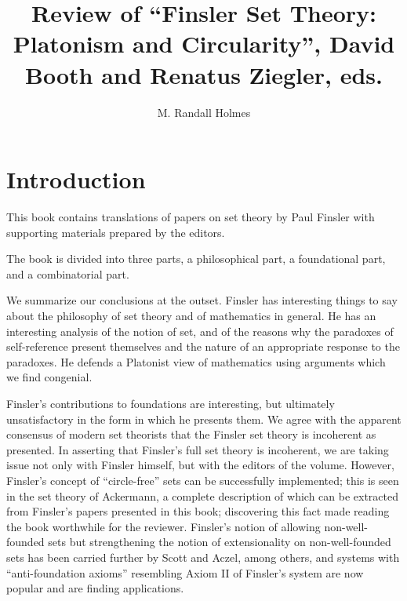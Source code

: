
\title{Review of ``Finsler Set Theory:  Platonism and Circularity'', David Booth and Renatus Ziegler, eds.}

\author{M. Randall Holmes}



\maketitle

\section{Introduction}

This book contains translations of papers on set theory by Paul
Finsler with supporting materials prepared by the editors.

The book is divided into three parts, a philosophical part, a
foundational part, and a combinatorial part.

We summarize our conclusions at the outset.  Finsler has interesting
things to say about the philosophy of set theory and of mathematics in
general.  He has an interesting analysis of the notion of set, and of
the reasons why the paradoxes of self-reference present themselves and
the nature of an appropriate response to the paradoxes.  He defends a
Platonist view of mathematics using arguments which we find
congenial.

Finsler's contributions to foundations are interesting, but ultimately
unsatisfactory in the form in which he presents them.  We agree with
the apparent consensus of modern set theorists that the Finsler set
theory is incoherent as presented.  In asserting that Finsler's full
set theory is incoherent, we are taking issue not only with Finsler
himself, but with the editors of the volume. However, Finsler's
concept of ``circle-free'' sets can be successfully implemented; this
is seen in the set theory of Ackermann, a complete description of
which can be extracted from Finsler's papers presented in this book;
discovering this fact made reading the book worthwhile for the
reviewer.  Finsler's notion of allowing non-well-founded sets but
strengthening the notion of extensionality on non-well-founded sets
has been carried further by Scott and Aczel, among others, and systems
with ``anti-foundation axioms'' resembling Axiom II of Finsler's
system are now popular and are finding applications.

